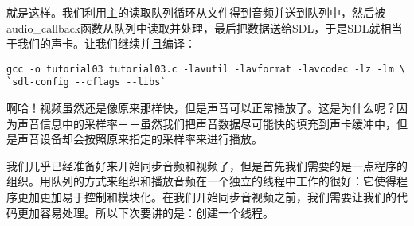 就是这样。我们利用主的读取队列循环从文件得到音频并送到队列中，然后被audio_callback函数从队列中读取并处理，最后把数据送给SDL，于是SDL就相当于我们的声卡。让我们继续并且编译：

\begin{lstlisting}
gcc -o tutorial03 tutorial03.c -lavutil -lavformat -lavcodec -lz -lm \
`sdl-config --cflags --libs`
\end{lstlisting}

啊哈！视频虽然还是像原来那样快，但是声音可以正常播放了。这是为什么呢？因为声音信息中的采样率－－虽然我们把声音数据尽可能快的填充到声卡缓冲中，但是声音设备却会按照原来指定的采样率来进行播放。

我们几乎已经准备好来开始同步音频和视频了，但是首先我们需要的是一点程序的组织。用队列的方式来组织和播放音频在一个独立的线程中工作的很好：它使得程序更加更加易于控制和模块化。在我们开始同步音视频之前，我们需要让我们的代码更加容易处理。所以下次要讲的是：创建一个线程。
